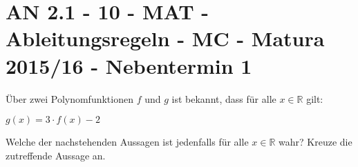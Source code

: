 \section{AN 2.1 - 10 - MAT - Ableitungsregeln - MC - Matura 2015/16 - Nebentermin 1}

\begin{beispiel}[AN 2.1]{1} %
Über zwei Polynomfunktionen $f$ und $g$ ist bekannt, dass für alle $x\in \mathbb{R}$ gilt: 

$g(x)=3\cdot f(x)-2$ \leer

Welche der nachstehenden Aussagen ist jedenfalls für alle $x\in \mathbb{R}$ wahr? Kreuze die zutreffende Aussage an. 

\end{beispiel}